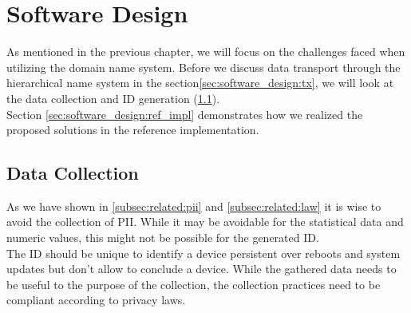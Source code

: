\chapter{Software Design}
\label{chap:software_design}

As mentioned in the previous chapter, we will focus on the challenges faced when utilizing the domain name system. Before we discuss data transport through the hierarchical name system in the section\ref{sec:software_design:tx}, we will look at the data collection and ID generation (\ref{sec:software_design:data_collection}).\\
Section \ref{sec:software_design:ref_impl} demonstrates how we realized the proposed solutions in the reference implementation.


%



\section{Data Collection}
\label{sec:software_design:data_collection}
    As we have shown in \ref{subsec:related:pii} and \ref{subsec:related:law} it is wise to avoid the collection of PII. While it may be avoidable for the statistical data and numeric values, this might not be possible for the generated ID.\\
    The ID should be unique to identify a device persistent over reboots and system updates but don't allow to conclude a device.
    While the gathered data needs to be useful to the purpose of the collection, the collection practices need to be compliant according to privacy laws. 
    

